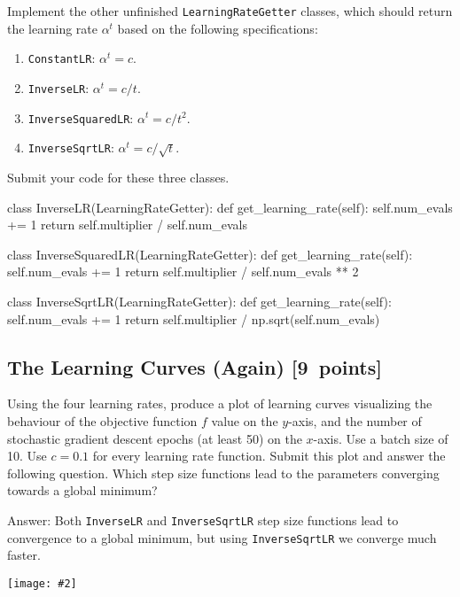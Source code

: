 \documentclass{article}
\newcommand{\blu}[1]{{\textcolor{blu}{#1}}}
\newenvironment{answer}{\par\begingroup\color{gre}Answer: }{\endgroup}
\let\ask\blu
\newcommand\pts[1]{\textcolor{pointscolour}{[#1~points]}}
\newcommand{\centerfig}[2]{\begin{center}\texttt{[image: \#2]}\end{center}}
\begin{document}
Implement the other unfinished \texttt{LearningRateGetter} classes, which should return the learning rate $\alpha^t$ based on the following
specifications:
\begin{enumerate}
    \item \texttt{ConstantLR}: $\alpha^t = c$.
    \item \texttt{InverseLR}: $\alpha^t = c/t$.
    \item \texttt{InverseSquaredLR}: $\alpha^t = c/t^2$.
    \item \texttt{InverseSqrtLR}: $\alpha^t = c/\sqrt{t}$.
\end{enumerate}
\ask{Submit your code for these three classes.}
\begin{python}
class InverseLR(LearningRateGetter):
    def get_learning_rate(self):
        self.num_evals += 1
        return self.multiplier / self.num_evals

class InverseSquaredLR(LearningRateGetter):
    def get_learning_rate(self):
        self.num_evals += 1
        return self.multiplier / self.num_evals ** 2

class InverseSqrtLR(LearningRateGetter):
    def get_learning_rate(self):
        self.num_evals += 1
        return self.multiplier / np.sqrt(self.num_evals)
\end{python}



\subsection{The Learning Curves (Again) \pts{9}}

Using the four learning rates, produce a plot of learning curves visualizing the behaviour of the objective function $f$ value on the $y$-axis, and the number of stochastic gradient descent epochs (at least 50) on the $x$-axis. Use a batch size of 10. Use $c = 0.1$ for every learning rate function. \blu{Submit this plot and answer the following question. Which step size functions lead to the parameters converging towards a global minimum?}
\begin{answer}
    Both \texttt{InverseLR} and \texttt{InverseSqrtLR} step size functions lead to convergence to a global minimum, but using \texttt{InverseSqrtLR} we converge much faster.
\end{answer}
\centerfig{0.6}{figs/gd_stochastic_curves}


\clearpage
\end{document}
